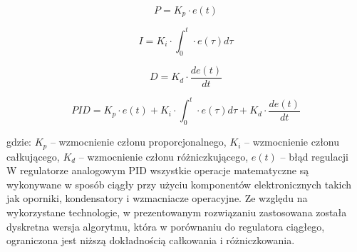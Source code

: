 \documentclass[12pt,twoside]{article}
\begin{document}
\begin{equation}
P = K_p \cdot e(t)
\label{Eq:rownanieP}
\end{equation}

\begin{equation}
I = K_i \cdot \int_0^t \cdot e(\tau)d\tau
\label{Eq:rownanieI}
\end{equation}

\begin{equation}
D = K_d \cdot \frac{de(t)}{dt}
\label{Eq:rownanieD}
\end{equation}


\begin{equation}
PID = K_p \cdot e(t) + K_i \cdot \int_0^t \cdot e(\tau)d\tau + K_d \cdot \frac{de(t)}{dt}
\label{Eq:rownaniePID}
\end{equation}

gdzie: $K_p$ -- wzmocnienie członu proporcjonalnego, $K_i$ -- wzmocnienie członu całkującego, $K_d$ -- wzmocnienie członu różniczkującego, $e(t)$ -- błąd regulacji \\

W regulatorze analogowym PID wszystkie operacje matematyczne są wykonywane w sposób ciągły przy użyciu komponentów elektronicznych takich jak oporniki, kondensatory i wzmacniacze operacyjne. Ze względu na wykorzystane technologie, w prezentowanym rozwiązaniu zastosowana została dyskretna wersja algorytmu, która w porównaniu do regulatora ciągłego, ograniczona jest niższą dokładnością całkowania i różniczkowania.

\lstset{language=C++}
\end{document}

